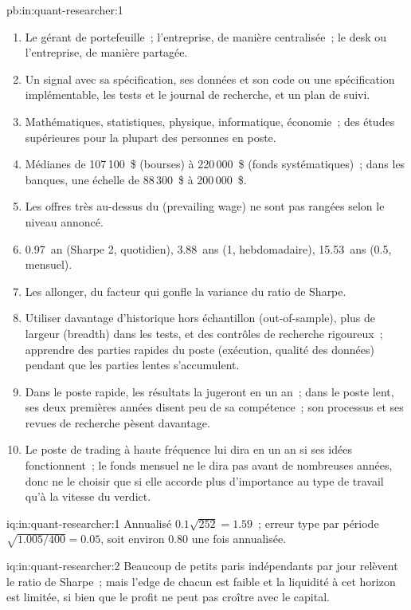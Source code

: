 \begin{solution}{pb:in:quant-researcher:1}
\begin{enumerate}
\item Le gérant de portefeuille~; l'entreprise, de manière centralisée~; le desk ou l'entreprise, de manière partagée.
\item Un signal avec sa spécification, ses données et son code ou une spécification implémentable, les tests et le journal de recherche, et un
plan de suivi.
\item Mathématiques, statistiques, physique, informatique, économie~; des études supérieures pour la plupart des personnes en poste.
\item Médianes de 107\,100~\$ (bourses) à 220\,000~\$ (fonds systématiques)~; dans les banques, une échelle de 88\,300~\$ à 200\,000~\$.
\item Les offres très au-dessus du  (prevailing wage) ne sont pas rangées selon le niveau annoncé.
\item 0.97~an (Sharpe 2, quotidien), 3.88~ans (1, hebdomadaire), 15.53~ans (0.5, mensuel).
\item Les allonger, du facteur qui gonfle la variance du ratio de Sharpe.
\item Utiliser davantage d'historique hors échantillon (out-of-sample), plus de largeur (breadth) dans les tests, et des contrôles de recherche rigoureux~; apprendre des parties rapides du
poste (exécution, qualité des données) pendant que les parties lentes s'accumulent.
\item Dans le poste rapide, les résultats la jugeront en un an~; dans le poste lent, ses deux premières années disent peu de
sa compétence~; son processus et ses revues de recherche pèsent davantage.
\item Le poste de trading à haute fréquence lui dira en un an si ses idées fonctionnent~; le fonds mensuel ne le dira pas avant de nombreuses années,
donc ne le choisir que si elle accorde plus d'importance au type de travail qu'à la vitesse du verdict.
\end{enumerate}
\end{solution}

\begin{solution}{iq:in:quant-researcher:1}
Annualisé $0.1\sqrt{252}=1.59$~; erreur type par période $\sqrt{1.005/400}=0.05$, soit environ 0.80 une fois annualisée.
\end{solution}

\begin{solution}{iq:in:quant-researcher:2}
Beaucoup de petits paris indépendants par jour relèvent le ratio de Sharpe~; mais l'edge de chacun est faible et la liquidité à cet horizon est
limitée, si bien que le profit ne peut pas croître avec le capital.
\end{solution}

